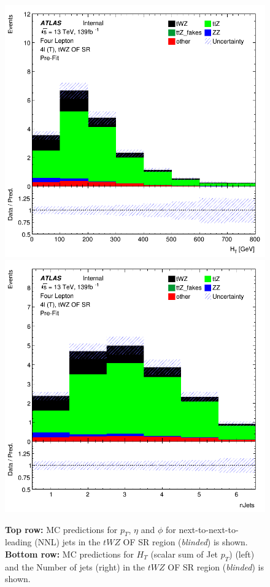 \begin{figure}[htbp]
    \includegraphics[width=.3\textwidth]{figures/PreFitPlots/lep4_tWZ_4T_OF_HT.png}   \quad
    \includegraphics[width=.3\textwidth]{figures/PreFitPlots/lep4_tWZ_4T_OF_Num_Jets.png}

    \caption{\textbf{Top row:} MC predictions for $p_{T}$, $\eta$ and $\phi$ for next-to-next-to-leading (NNL) jets in the $tWZ$ OF SR region (\textit{blinded}) is shown. \textbf{Bottom row:} MC predictions for $H_{T}$ (scalar sum of Jet $p_{T}$) (left) and the Number of jets (right) in the $tWZ$ OF SR region (\textit{blinded}) is shown.}
    \label{fig:4lep-OF-SR-NNLjetPlots} 
\end{figure}



